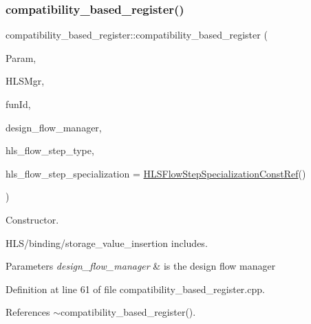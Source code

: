 \subsubsection{\texorpdfstring{compatibility\+\_\+based\+\_\+register()}{compatibility\_based\_register()}}
{\footnotesize\ttfamily compatibility\+\_\+based\+\_\+register\+::compatibility\+\_\+based\+\_\+register (\begin{DoxyParamCaption}\item[{const \hyperlink{Parameter_8hpp_a37841774a6fcb479b597fdf8955eb4ea}{Parameter\+Const\+Ref}}]{Param,  }\item[{const \hyperlink{hls__manager_8hpp_acd3842b8589fe52c08fc0b2fcc813bfe}{H\+L\+S\+\_\+manager\+Ref}}]{H\+L\+S\+Mgr,  }\item[{unsigned int}]{fun\+Id,  }\item[{const Design\+Flow\+Manager\+Const\+Ref}]{design\+\_\+flow\+\_\+manager,  }\item[{const \hyperlink{hls__step_8hpp_ada16bc22905016180e26fc7e39537f8d}{H\+L\+S\+Flow\+Step\+\_\+\+Type}}]{hls\+\_\+flow\+\_\+step\+\_\+type,  }\item[{const \hyperlink{hls__step_8hpp_a5fdd2edf290c196531d21d68e13f0e74}{H\+L\+S\+Flow\+Step\+Specialization\+Const\+Ref}}]{hls\+\_\+flow\+\_\+step\+\_\+specialization = {\ttfamily \hyperlink{hls__step_8hpp_a5fdd2edf290c196531d21d68e13f0e74}{H\+L\+S\+Flow\+Step\+Specialization\+Const\+Ref}()} }\end{DoxyParamCaption})}



Constructor. 

H\+L\+S/binding/storage\+\_\+value\+\_\+insertion includes.


\begin{DoxyParams}{Parameters}
{\em design\+\_\+flow\+\_\+manager} & is the design flow manager \\
\hline
\end{DoxyParams}


Definition at line 61 of file compatibility\+\_\+based\+\_\+register.\+cpp.



References $\sim$compatibility\+\_\+based\+\_\+register().

